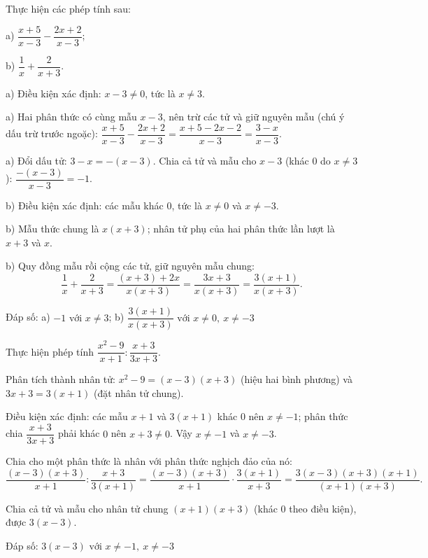 \begin{problem}[8DS-PS-034]
Thực hiện các phép tính sau:

a) $\dfrac{x + 5}{x - 3} - \dfrac{2x + 2}{x - 3}$;

b) $\dfrac{1}{x} + \dfrac{2}{x + 3}$.

\begin{solution}
a) Điều kiện xác định: $x - 3 \neq 0$, tức là $x \neq 3$.

a) Hai phân thức có cùng mẫu $x - 3$, nên trừ các tử và giữ nguyên mẫu (chú ý dấu trừ trước ngoặc): $\dfrac{x + 5}{x - 3} - \dfrac{2x + 2}{x - 3} = \dfrac{x + 5 - 2x - 2}{x - 3} = \dfrac{3 - x}{x - 3}$.

a) Đổi dấu tử: $3 - x = -(x - 3)$. Chia cả tử và mẫu cho $x - 3$ (khác $0$ do $x \neq 3$): $\dfrac{-(x - 3)}{x - 3} = -1$.

b) Điều kiện xác định: các mẫu khác $0$, tức là $x \neq 0$ và $x \neq -3$.

b) Mẫu thức chung là $x(x + 3)$; nhân tử phụ của hai phân thức lần lượt là $x + 3$ và $x$.

b) Quy đồng mẫu rồi cộng các tử, giữ nguyên mẫu chung:
\[ \dfrac{1}{x} + \dfrac{2}{x + 3} = \dfrac{(x + 3) + 2x}{x(x + 3)} = \dfrac{3x + 3}{x(x + 3)} = \dfrac{3(x + 1)}{x(x + 3)}. \]

Đáp số: a) $\boxed{-1 \text{ với } x \neq 3}$; b) $\boxed{\dfrac{3(x + 1)}{x(x + 3)} \text{ với } x \neq 0,\ x \neq -3}$
\end{solution}
\end{problem}

\begin{problem}[8DS-PS-035]
Thực hiện phép tính $\dfrac{x^2 - 9}{x + 1} : \dfrac{x + 3}{3x + 3}$.

\begin{solution}
Phân tích thành nhân tử: $x^2 - 9 = (x - 3)(x + 3)$ (hiệu hai bình phương) và $3x + 3 = 3(x + 1)$ (đặt nhân tử chung).

Điều kiện xác định: các mẫu $x + 1$ và $3(x + 1)$ khác $0$ nên $x \neq -1$; phân thức chia $\dfrac{x + 3}{3x + 3}$ phải khác $0$ nên $x + 3 \neq 0$. Vậy $x \neq -1$ và $x \neq -3$.

Chia cho một phân thức là nhân với phân thức nghịch đảo của nó:
\[ \dfrac{(x - 3)(x + 3)}{x + 1} : \dfrac{x + 3}{3(x + 1)} = \dfrac{(x - 3)(x + 3)}{x + 1} \cdot \dfrac{3(x + 1)}{x + 3} = \dfrac{3(x - 3)(x + 3)(x + 1)}{(x + 1)(x + 3)}. \]

Chia cả tử và mẫu cho nhân tử chung $(x + 1)(x + 3)$ (khác $0$ theo điều kiện), được $3(x - 3)$.

Đáp số: $\boxed{3(x - 3) \text{ với } x \neq -1,\ x \neq -3}$
\end{solution}
\end{problem}

